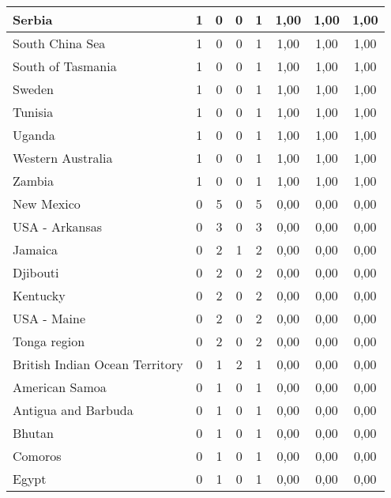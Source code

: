 {\begin{table}[!ht]
\begin{tabular}{|l|ccc|c|ccc|}
Serbia	 & 1 	 & 0   	 & 0   	& 1	 & 1,00 &	1,00 &	1,00 \\ \hline
South China Sea	 & 1 	 & 0   	 & 0   	& 1	 & 1,00 &	1,00 &	1,00 \\ \hline
South of Tasmania	 & 1 	 & 0   	 & 0   	& 1	 & 1,00 &	1,00 &	1,00 \\ \hline
Sweden	 & 1 	 & 0   	 & 0   	& 1	 & 1,00 &	1,00 &	1,00 \\ \hline
Tunisia	 & 1 	 & 0   	 & 0   	& 1	 & 1,00 &	1,00 &	1,00 \\ \hline
Uganda	 & 1 	 & 0   	 & 0   	& 1	 & 1,00 &	1,00 &	1,00 \\ \hline
Western Australia	 & 1 	 & 0   	 & 0   	& 1	 & 1,00 &	1,00 &	1,00 \\ \hline
Zambia	 & 1 	 & 0   	 & 0   	& 1	 & 1,00 &	1,00 &	1,00 \\ \hline
New Mexico	 & 0   	 & 5 	 & 0   	& 5	 & 0,00 &	0,00 &	0,00 \\ \hline
USA - Arkansas	 & 0   	 & 3 	 & 0   	& 3	 & 0,00 &	0,00 &	0,00 \\ \hline
Jamaica	 & 0   	 & 2 	 & 1 	& 2	 & 0,00 &	0,00 &	0,00 \\ \hline
Djibouti	 & 0   	 & 2 	 & 0   	& 2	 & 0,00 &	0,00 &	0,00 \\ \hline
Kentucky	 & 0   	 & 2 	 & 0   	& 2	 & 0,00 &	0,00 &	0,00 \\ \hline
USA - Maine	 & 0   	 & 2 	 & 0   	& 2	 & 0,00 &	0,00 &	0,00 \\ \hline
Tonga region	 & 0   	 & 2 	 & 0   	& 2	 & 0,00 &	0,00 &	0,00 \\ \hline
British Indian Ocean Territory	 & 0   	 & 1 	 & 2 	& 1	 & 0,00 &	0,00 &	0,00 \\ \hline
American Samoa	 & 0   	 & 1 	 & 0   	& 1	 & 0,00 &	0,00 &	0,00 \\ \hline
Antigua and Barbuda	 & 0   	 & 1 	 & 0   	& 1	 & 0,00 &	0,00 &	0,00 \\ \hline
Bhutan	 & 0   	 & 1 	 & 0   	& 1	 & 0,00 &	0,00 &	0,00 \\ \hline
Comoros	 & 0   	 & 1 	 & 0   	& 1	 & 0,00 &	0,00 &	0,00 \\ \hline
Egypt	 & 0   	 & 1 	 & 0   	& 1	 & 0,00 &	0,00 &	0,00 \\ \hline
   \end{tabular}
\end{table}}

